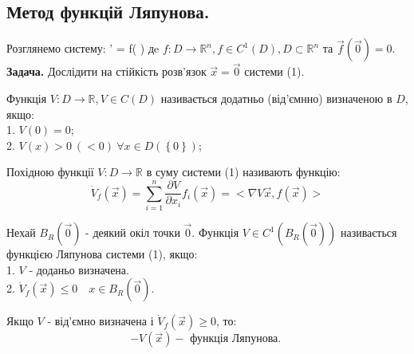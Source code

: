 \subsection{Метод функцій Ляпунова.}

Розглянемо систему:
\be
 ' = f( )
\ee
дe $f: D \to \mathbb{R}^n, f\in C^{1} \left( D \right), D \subset \mathbb{R}^n $ та $\overrightarrow{f} ( \overrightarrow{0}) = 0$.
\textbf{Задача. } Дослідити на стійкість розв'язок $ \overrightarrow{x} = \overrightarrow{0}$ системи (1).

 \begin{defo}
  Функція $V : D \to \mathbb{R} , V \in C(D) $ називається додатньо (від'ємнно) визначеною в $D$, якщо:
  \\1. $V(0) = 0$;\\
  2. $ V(x) > 0 \ (<0) \ \forall x \in D(\left\lbrace 0 \right\rbrace)$;
 \end{defo}

 \begin{defo}
Похідною функції $ V : D \to \mathbb{R}$ в суму системи (1) називають функцію:
$$
\dot{V}_f(\overrightarrow{x}) =  \sum\limits_{i = 1}^{n}{ \frac{\partial V}{ \partial x_i} f_{i}( \overrightarrow{x}) } = <\nabla V \overrightarrow{x}, f(\overrightarrow{x})>
$$
 \end{defo}

 \begin{defo}
  Нехай $B_{R} ( \overrightarrow{0} ) $ - деякий окіл точки $ \overrightarrow{0} $. Функція $V \in C^{1} (B_{R} (\overrightarrow{0}))$ називається функцією Ляпунова системи (1), якщо:\\
  1. $ V $ - доданьо визначена. \\
  2. $ \dot{V}_f (\overrightarrow{x}) \leq 0 \quad x \in B_{R} ( \overrightarrow{0})$.
 \end{defo}

 \begin{remark}
     Якщо $ V $ - від'ємно визначена і $ \dot{V}_f ( \overrightarrow{x}) \geq 0$, то:
     $$
     - V ( \overrightarrow{x} ) - \text{ функція Ляпунова. }
     $$
 \end{remark}

